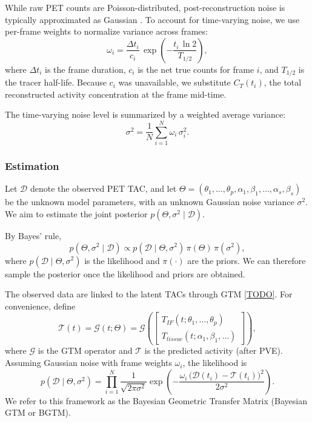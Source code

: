 While raw PET counts are Poisson-distributed, post-reconstruction noise is typically approximated as Gaussian \cite{TODO}.
To account for time-varying noise, we use per-frame weights to normalize variance across frames:
\begin{equation}
	\omega_{i} = \frac{\Delta t_i}{c_i}\,\exp\!\left(-\frac{t_{i}\,\ln 2}{T_{1/2}}\right),
\end{equation}
where \(\Delta t_i\) is the frame duration, \(c_i\) is the net true counts for frame \(i\), and \(T_{1/2}\) is the tracer half-life.
Because \(c_i\) was unavailable, we substitute \(C_T(t_i)\), the total reconstructed activity concentration at the frame mid-time.

The time-varying noise level is summarized by a weighted average variance:
\begin{equation}
	\sigma^2 = \frac{1}{N} \sum_{i=1}^{N} \omega_i\,\sigma_i^2.
\end{equation}

\subsubsection{Estimation}
Let \(\mathcal{D}\) denote the observed PET TAC, and let \( \Theta = (\theta_{1}, \dots,\theta_{p}, \alpha_{1}, \beta_{1}, \dots, \alpha_{s}, \beta_{s}) \) be the unknown model parameters, with an unknown Gaussian noise variance \(\sigma^2\).
We aim to estimate the joint posterior \(p(\Theta,\sigma^2\mid \mathcal{D})\).

By Bayes’ rule,
\begin{equation}
	p(\Theta,\sigma^2 \mid \mathcal{D}) \propto p(\mathcal{D} \mid \Theta,\sigma^2)\,\pi( \Theta )\,\pi( \sigma^2),
\end{equation}
where \(p(\mathcal{D} \mid \Theta,\sigma^2)\) is the likelihood and \(\pi(\cdot)\) are the priors.
We can therefore sample the posterior once the likelihood and priors are obtained.

The observed data are linked to the latent TACs through GTM \ref{TODO}.
For convenience, define
\begin{equation}
	\mathcal{T}(t) = \mathcal{G}(t;\Theta) =
	\mathcal{G}\!\left(
	\begin{bmatrix}
			T_{IF}(t;\theta_{1}, \dots, \theta_{p}) \\
			T_{tissue}(t;\alpha_{1}, \beta_{1}, \dots)
		\end{bmatrix}\right),
\end{equation}
where \(\mathcal{G}\) is the GTM operator and \(\mathcal{T}\) is the predicted activity (after PVE).
Assuming Gaussian noise with frame weights \(\omega_i\), the likelihood is
\begin{equation}
	p(\mathcal{D} \mid \Theta,\sigma^2) = \prod_{i=1}^N \frac{1}{\sqrt{2\pi \sigma^2}} \exp\!\left( -\frac{\omega_i\,\bigl(\mathcal{D}(t_i) - \mathcal{T}(t_i)\bigr)^2}{2\sigma^2} \right).
\end{equation}
We refer to this framework as the Bayesian Geometric Transfer Matrix (Bayesian GTM or BGTM).

